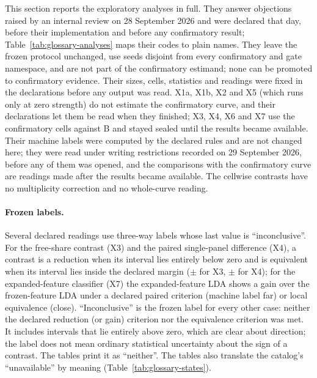 
This section reports the exploratory analyses in full. They answer objections raised by an internal review on 28 September 2026 and were declared that day, before their implementation and before any confirmatory result; Table~\ref{tab:glossary-analyses} maps their codes to plain names. They leave the frozen protocol unchanged, use seeds disjoint from every confirmatory and gate namespace, and are not part of the confirmatory estimand; none can be promoted to confirmatory evidence. Their sizes, cells, statistics and readings were fixed in the declarations before any output was read. X1a, X1b, X2 and X5 (which runs only at zero strength) do not estimate the confirmatory curve, and their declarations let them be read when they finished; X3, X4, X6 and X7 use the confirmatory cells against B and stayed sealed until the results became available. Their machine labels were computed by the declared rules and are not changed here; they were read under writing restrictions recorded on 29 September 2026, before any of them was opened, and the comparisons with the confirmatory curve are readings made after the results became available. The cellwise contrasts have no multiplicity correction and no whole-curve reading.

\paragraph{Frozen labels.}
Several declared readings use three-way labels whose last value is ``inconclusive''. For the free-share contrast (X3) and the paired single-panel difference (X4), a contrast is a reduction when its interval lies entirely below zero and is equivalent when its interval lies inside the declared margin ($\pm$ for X3, $\pm$ for X4); for the expanded-feature classifier (X7) the expanded-feature LDA shows a gain over the frozen-feature LDA under a declared paired criterion (machine label far) or local equivalence (close). ``Inconclusive'' is the frozen label for every other case: neither the declared reduction (or gain) criterion nor the equivalence criterion was met. It includes intervals that lie entirely above zero, which are clear about direction; the label does not mean ordinary statistical uncertainty about the sign of a contrast. The tables print it as ``neither''. The tables also translate the catalog's ``unavailable'' by meaning (Table~\ref{tab:glossary-states}).

